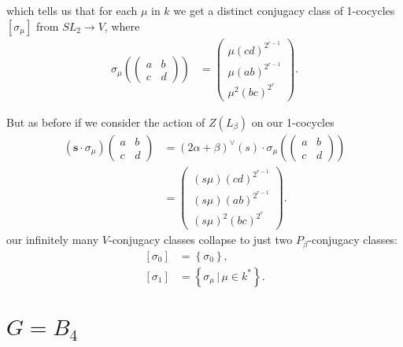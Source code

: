 which tells us that for each $\mu$ in $k$ we get a distinct conjugacy class of 1-cocycles $[\sigma_\mu]$ from $SL_2 \rightarrow V$, where
\begin{align*}
\sigma_\mu\left(\left(\begin{matrix} a & b \\ c & d \end{matrix}\right)\right) &=
\left(\begin{matrix}  \mu(cd)^{2^{r-1}}  \\ \mu\left(ab \right)^{2^{r-1}} \\ \mu^2\left( bc \right)^{2^r} \end{matrix}\right).
\end{align*}

But as before if we consider the action of $Z(L_\beta)$ on our 1-cocycles
\begin{align*}
(\mathbf{s}\cdot \sigma_\mu)\left(\begin{matrix} a & b \\ c & d \end{matrix}\right) &=
(2\alpha + \beta)^\vee(s) \cdot \sigma_\mu\left(\left(\begin{matrix} a & b \\ c & d \end{matrix}\right)\right)\\
&=
\left(\begin{matrix}  (s\mu)(cd)^{2^{r-1}}  \\ (s\mu)\left(ab \right)^{2^{r-1}} \\ (s\mu)^2\left( bc \right)^{2^r} \end{matrix}\right).
\end{align*}
our infinitely many $V$-conjugacy classes collapse to just two $P_\beta$-conjugacy classes:
\begin{align*}
\left[\sigma_0\right] &= \left\{ \sigma_0 \right\}, \\
\left[\sigma_1\right] &= \left\{ \sigma_\mu \, | \, \mu \in k^* \right\}.
\end{align*}

\section{$G = B_4$}

